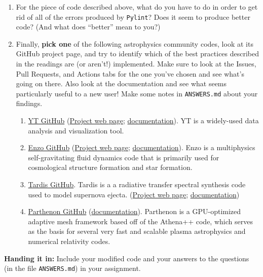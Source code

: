 \documentclass[10pt]{article}
\begin{document}
\begin{enumerate}
  \item For the piece of code described above, what do you have to do
    in order to get rid of all of the errors produced by
    \texttt{Pylint}?  Does it seem to produce better code?
    (And what does ``better'' mean to you?)

  \item Finally, \textbf{pick one} of the following astrophysics community
    codes, look at its GitHub project page, and try to identify which of the
    best practices described in the readings are (or aren't!)
    implemented.  Make sure to look at the Issues, Pull Requests, and
    Actions tabs for the one you've chosen and see what's going on
    there.  Also look at the documentation and see what seems
    particularly useful to a new user!
    Make some notes in
    \texttt{ANSWERS.md} about your findings.

    \begin{enumerate}
      \item \href{https://github.com/yt-project/yt}{YT GitHub}
        (\href{https://yt-project.org/}{Project web page};
        \href{http://yt-project.org/docs/dev/}{documentation}).  YT is
        a widely-used data analysis and visualization tool.
      \item \href{https://github.com/enzo-project/enzo-dev}{Enzo GitHub}
        (\href{https://enzo-project.org/}{Project web page};
        \href{https://enzo.readthedocs.io/en/latest/}{documentation}).
        Enzo is a multiphysics self-gravitating fluid dynamics code
        that is primarily used for cosmological structure formation
        and star formation.  
      \item \href{https://github.com/tardis-sn/tardis/}{Tardis
          GitHub}.  Tardis is a a radiative transfer spectral
        synthesis code used to model supernova ejecta.
        (\href{https://tardis-sn.github.io/tardis/}{Project web page}; \href{https://tardis-sn.github.io/tardis/}{documentation})
      \item
        \href{https://github.com/parthenon-hpc-lab/parthenon}{Parthenon
        GitHub}
      (\href{https://github.com/parthenon-hpc-lab/parthenon/tree/develop/docs}{documentation}).
      Parthenon is a GPU-optimized adaptive mesh framework based off of the
      Athena++ code, which serves as the basis for several very fast
      and scalable plasma astrophysics and numerical relativity codes.
    \end{enumerate}

\end{enumerate}


 
\vspace{5mm}

\noindent \textbf{Handing it in:} Include your modified code and
your answers to the questions (in the file \texttt{ANSWERS.md})
in your assignment.
\end{document}
